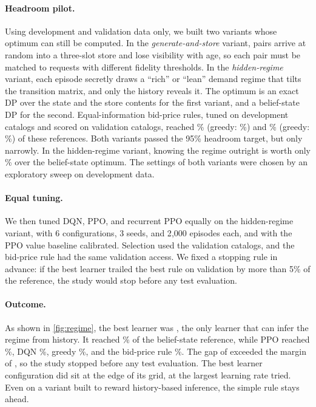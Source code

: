 \documentclass[10pt]{article}
\begin{document}
\paragraph{Headroom pilot.} Using development and validation data only, we built two variants whose optimum can still be computed. In the \emph{generate-and-store} variant, pairs arrive at random into a three-slot store and lose visibility with age, so each pair must be matched to requests with different fidelity thresholds. In the \emph{hidden-regime} variant, each episode secretly draws a ``rich'' or ``lean'' demand regime that tilts the transition matrix, and only the history reveals it. The optimum is an exact DP over the state and the store contents for the first variant, and a belief-state DP for the second. Equal-information bid-price rules, tuned on development catalogs and scored on validation catalogs, reached \hrStoreRule\% (greedy: \hrStoreGreedy\%) and \hrRegimeRule\% (greedy: \hrRegimeGreedy\%) of these references. Both variants passed the 95\% headroom target, but only narrowly. In the hidden-regime variant, knowing the regime outright is worth only \hrRegimeOracle\% over the belief-state optimum. The settings of both variants were chosen by an exploratory sweep on development data.

\paragraph{Equal tuning.} We then tuned DQN, PPO, and recurrent PPO equally on the hidden-regime variant, with 6 configurations, 3 seeds, and 2{,}000 episodes each, and with the PPO value baseline calibrated. Selection used the validation catalogs, and the bid-price rule had the same validation access. We fixed a stopping rule in advance: if the best learner trailed the best rule on validation by more than 5\% of the reference, the study would stop before any test evaluation.

\paragraph{Outcome.} As shown in \cref{fig:regime}, the best learner was \rgBestName, the only learner that can infer the regime from history. It reached \rgBestFrac\% of the belief-state reference, while PPO reached \rgPPOFrac\%, DQN \rgDQNFrac\%, greedy \rgGreedyFrac\%, and the bid-price rule \rgRuleFrac\%. The gap of \rgGap{} exceeded the margin of \rgMargin, so the study stopped before any test evaluation. The best learner configuration did sit at the edge of its grid, at the largest learning rate tried. Even on a variant built to reward history-based inference, the simple rule stays ahead.
\end{document}
